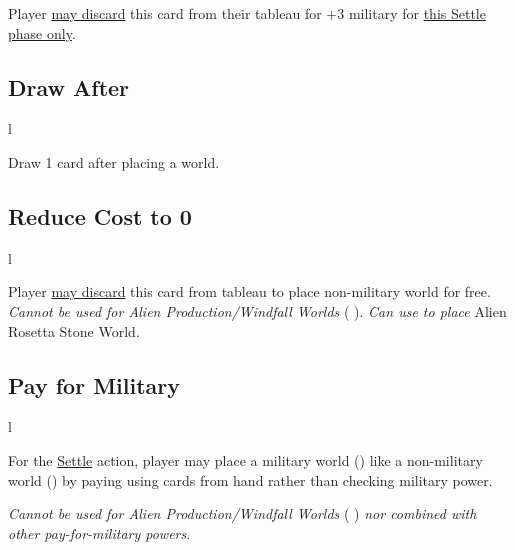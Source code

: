 \documentclass[letterpaper,landscape,twocolumn,8pt]{extarticle}
\newcommand{\inline}[1]{\scalerel*{#1}{M}}
\begin{document}
\begin{minipage}[t]{\calc{1/3}\columnwidth}
Player \underline{may discard} this card from their tableau for +3 military for \underline{this Settle phase only}.
\subsection*{Draw After}
\begin{wrapfigure}{l}{\columnwidth}
    
\end{wrapfigure}

Draw 1 card after placing a world.

\end{minipage}
\begin{minipage}[t]{\calc{1/3}\columnwidth}
\setlength{\intextsep}{0pt}%

\subsection*{Reduce Cost to 0}
\begin{wrapfigure}{l}{\columnwidth}
    
\end{wrapfigure}

Player \underline{may discard} this card from tableau to place non-military
world for free.
\smallbreak{}
\textit{Cannot be used for Alien Production/Windfall Worlds}
(\inline{}
\inline{}). \textit{Can use to place} Alien Rosetta Stone World.
\subsection*{Pay for Military}
\begin{wrapfigure}{l}{\columnwidth}
    
\end{wrapfigure}

For the \underline{Settle} action, player may place a military world
(\inline{}) like a non-military
world (\inline{}) by paying
using cards from hand rather than checking military power.

\smallbreak{}

\textit{Cannot be used for Alien Production/Windfall Worlds}
(\inline{}
\inline{}) \textit{nor
combined with other pay-for-military powers}.

\end{minipage}
\end{document}
